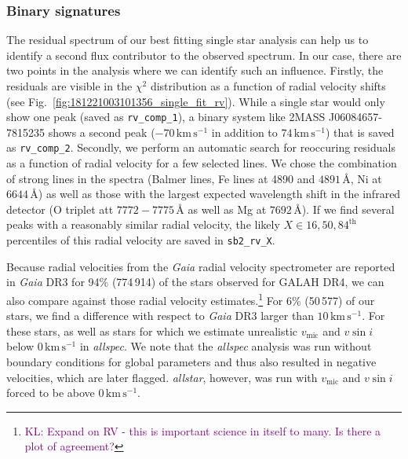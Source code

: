 \documentclass[
  journal=pasa,
  manuscript=research-paper, %
  year=2024,
  volume=37
]{cup-journal}
\newcommand{\SB}[1]{{\textcolor{purple}{#1}}}
\newcommand{\vmic}{$v_\mathrm{mic}$\xspace}
\newcommand{\vsini}{$v \sin i$\xspace}
\newcommand{\Gaia}{\textit{Gaia}\xspace}
\begin{document}
\subsubsection{Binary signatures} \label{sec:trigger_binary_module}

The residual spectrum of our best fitting single star analysis can help us to identify a second flux contributor to the observed spectrum. In our case, there are two points in the analysis where we can identify such an influence. Firstly, the residuals are visible in the $\chi^2$ distribution as a function of radial velocity shifts (see Fig.~\ref{fig:181221003101356_single_fit_rv}). While a single star would only show one peak (saved as \texttt{rv\_comp\_1}), a binary system like 2MASS J06084657-7815235 shows a second peak ($-70\,\mathrm{km\,s^{-1}}$ in addition to $74\,\mathrm{km\,s^{-1}}$) that is saved as \texttt{rv\_comp\_2}. Secondly, we perform an automatic search for reoccuring residuals as a function of radial velocity for a few selected lines. We chose the combination of strong lines in the spectra (Balmer lines, Fe lines at 4890 and $4891\,\text{\AA}$, Ni at $6644\,\text{\AA}$) as well as those with the largest expected wavelength shift in the infrared detector (O triplet att $7772-7775\,\text{\AA}$ as well as Mg at $7692\,\text{\AA}$). If we find several peaks with a reasonably similar radial velocity, the likely $X \in {16,50,84}^\text{th}$ percentiles of this radial velocity are saved in \texttt{sb2\_rv\_X}.

Because radial velocities from the \Gaia radial velocity spectrometer \citep{Katz2022} are reported in \Gaia DR3 for 94\% (774\,914) of the stars observed for GALAH DR4, we can also compare against those radial velocity estimates.\footnote{\SB{KL: Expand on RV - this is important science in itself to many. Is there a plot of agreement?}} For 6\% (50\,577) of our stars, we find a difference with respect to \Gaia DR3 larger than $10\,\mathrm{km\,s^{-1}}$. For these stars, as well as stars for which we estimate unrealistic \vmic and \vsini below $0\,\mathrm{km\,s^{-1}}$ in \textit{allspec}. We note that the \textit{allspec} analysis was run without boundary conditions for global parameters and thus also resulted in negative velocities, which are later flagged. \textit{allstar}, however, was run with \vmic and \vsini forced to be above $0\,\mathrm{km\,s^{-1}}$.
\end{document}
